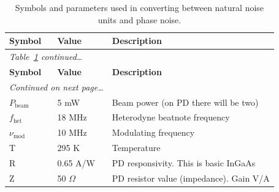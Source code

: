 \documentclass[11pt]{article}
\newcommand{\rA}{\rowcolor{rowA}}
\newcommand{\rB}{\rowcolor{rowB}}
\begin{document}
\begin{longtable}{p{2.2cm} p{2.2cm} p{12cm}}
\caption{%
    Symbols and parameters used in converting between natural noise units
    and phase noise.
} \label{tab:symbols} \\
\toprule
\rowcolor{white}
\textbf{Symbol} & \textbf{Value} & \textbf{Description} \\
\midrule
\endfirsthead

\multicolumn{2}{l}{\small\textit{Table~\ref{tab:symbols} continued\ldots}} \\[2pt]
\toprule
\rowcolor{white}
\textbf{Symbol} & \textbf{Value} & \textbf{Description} \\
\midrule
\endhead

\midrule
\multicolumn{2}{r}{\small\textit{Continued on next page\ldots}} \\
\endfoot

\bottomrule
\endlastfoot

\rA $P_\mathrm{beam}$ & 5 mW & Beam power (on PD there will be two) \\[2pt]
\rB $f_\mathrm{het}$ & 18 MHz & Heterodyne beatnote frequency \\[2pt]
\rA $\nu_\mathrm{mod}$ & 10 MHz  & Modulating frequency \\[2pt]
\rB T & 295 K & Temperature \\[2pt]
\rA R & 0.65 A/W & PD responsivity. This is basic InGaAs \\[2pt]
\rB Z & 50 $\Omega$ & PD resistor value (impedance). Gain V/A \\[2pt]

\end{longtable}

\end{document}
